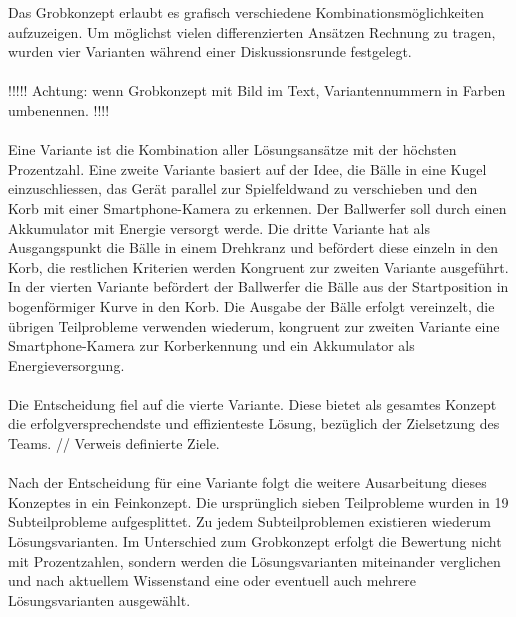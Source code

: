 Das Grobkonzept erlaubt es grafisch verschiedene Kombinationsmöglichkeiten aufzuzeigen. Um möglichst vielen differenzierten Ansätzen Rechnung zu tragen, wurden vier Varianten während einer Diskussionsrunde festgelegt.\\\\ 
!!!!! Achtung: wenn Grobkonzept mit Bild im Text, Variantennummern in Farben umbenennen. !!!!\\\\
Eine Variante ist die Kombination aller Lösungsansätze mit der höchsten Prozentzahl. Eine zweite Variante basiert auf der Idee, die Bälle in eine Kugel einzuschliessen, das Gerät parallel zur Spielfeldwand zu verschieben und den Korb mit einer Smartphone-Kamera zu erkennen. Der Ballwerfer soll durch einen Akkumulator mit Energie versorgt werde. Die dritte Variante hat als Ausgangspunkt die Bälle in einem Drehkranz und befördert diese einzeln in den Korb, die restlichen Kriterien werden Kongruent zur zweiten Variante ausgeführt. In der vierten Variante befördert der Ballwerfer die Bälle aus der Startposition in bogenförmiger Kurve in den Korb. Die Ausgabe der Bälle erfolgt vereinzelt, die übrigen Teilprobleme verwenden wiederum, kongruent zur zweiten Variante eine Smartphone-Kamera zur Korberkennung und ein Akkumulator als Energieversorgung.\\
\\
Die Entscheidung fiel auf die vierte Variante. Diese bietet als gesamtes Konzept die erfolgversprechendste und effizienteste Lösung, bezüglich der Zielsetzung des Teams. // Verweis definierte Ziele.\\
\\
Nach der Entscheidung für eine Variante folgt die weitere Ausarbeitung dieses Konzeptes
in ein Feinkonzept. Die ursprünglich sieben Teilprobleme wurden in 19 Subteilprobleme
aufgesplittet. Zu jedem Subteilproblemen existieren wiederum Lösungsvarianten. Im Unterschied zum Grobkonzept erfolgt die Bewertung nicht mit Prozentzahlen, sondern werden die Lösungsvarianten miteinander verglichen und nach aktuellem Wissenstand eine oder eventuell auch mehrere Lösungsvarianten ausgewählt. 


